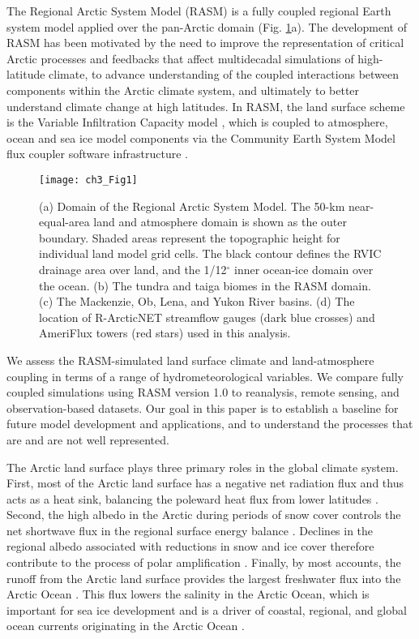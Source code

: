 The Regional Arctic System Model (RASM) is a fully coupled regional Earth system model \citep{Roberts_2015a} applied over the pan-Arctic domain (Fig. \ref{fig:domain}a).
The development of RASM has been motivated by the need to improve the representation of critical Arctic processes and feedbacks that affect multidecadal simulations of high-latitude climate, to advance understanding of the coupled interactions between components within the Arctic climate system, and ultimately to better understand climate change at high latitudes.
In RASM, the land surface scheme is the Variable Infiltration Capacity model \citep[VIC; ][]{Liang_1994,Liang_1996}, which is coupled to atmosphere, ocean and sea ice model components via the Community Earth System Model \citep[CESM;][]{Hurrell_2013} flux coupler software infrastructure \citep{Craig_2012}.

\begin{figure}
  \centering
  \texttt{[image: ch3\_Fig1]}
  \caption{(a) Domain of the Regional Arctic System Model.
  The 50-km near-equal-area land and atmosphere domain is shown as the outer boundary.
  Shaded areas represent the topographic height for individual land model grid cells.
  The black contour defines the RVIC drainage area over land, and the 1/12$^{\circ}$ inner ocean-ice domain over the ocean.
  (b) The tundra and taiga biomes in the RASM domain.
  (c) The Mackenzie, Ob, Lena, and Yukon River basins.
  (d) The location of R-ArcticNET streamflow gauges (dark blue crosses) and AmeriFlux towers (red stars) used in this analysis.}
  \label{fig:domain}
\end{figure}

We assess the RASM-simulated land surface climate and land-atmosphere coupling in terms of a range of hydrometeorological variables.
We compare fully coupled simulations using RASM version 1.0 to reanalysis, remote sensing, and observation-based datasets.
Our goal in this paper is to establish a baseline for future model development and applications, and to understand the processes that are and are not well represented.

The Arctic land surface plays three primary roles in the global climate system.
First, most of the Arctic land surface has a negative net radiation flux and thus acts as a heat sink, balancing the poleward heat flux from lower latitudes \citep{Fasullo_2008}.
Second, the high albedo in the Arctic during periods of snow cover controls the net shortwave flux in the regional surface energy balance \citep{Flanner_2011}.
Declines in the regional albedo associated with reductions in snow and ice cover therefore contribute to the process of polar amplification \citep{Serreze_2006c}.
Finally, by most accounts, the runoff from the Arctic land surface provides the largest freshwater flux into the Arctic Ocean \citep{Serreze_2006a}.
This flux lowers the salinity in the Arctic Ocean, which is important for sea ice development and is a driver of coastal, regional, and global ocean currents originating in the Arctic Ocean \citep{Morison_2012,Serreze_2006a}.

